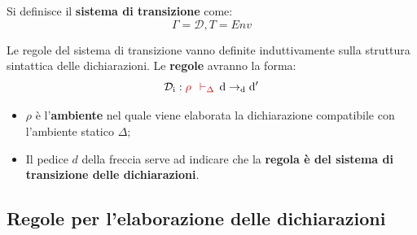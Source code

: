 \documentclass[a4paper]{article}
\begin{document}
	\begin{boxdef}
		Si definisce il \textcolor{Red3}{\textbf{sistema di transizione}} come:
		\begin{equation*}
			\Gamma = \mathcal{D}, T = Env
		\end{equation*}
	\end{boxdef}

	\noindent
	Le regole del sistema di transizione vanno definite induttivamente sulla struttura sintattica delle dichiarazioni. Le \textbf{regole} avranno la forma:
	\begin{equation*}
		\mathcal{D}_{\mathrm{i}} : \textcolor{Red3}{\rho \:\: \vdash_{\Delta}} \:\: \mathrm{d} \rightarrow_{\mathrm{d}} \mathrm{d}'
	\end{equation*}

	\begin{itemize}
		\item $\rho$ è l'\textbf{ambiente} nel quale viene elaborata la dichiarazione compatibile con l'ambiente statico $\Delta$;
		
		\item Il pedice $d$ della freccia serve ad indicare che la \textbf{regola è del sistema di transizione delle dichiarazioni}.
	\end{itemize}\newpage
	
	\subsection{Regole per l'elaborazione delle dichiarazioni}
	
\end{document}
